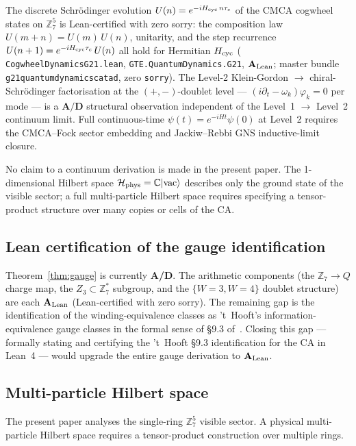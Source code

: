 \documentclass[11pt]{article}
\theoremstyle{remark}
\newcommand{\GTE}{\text{GTE}}
\newcommand{\lean}[1]{%
  \penalty-100
  \begingroup\def\_{\textunderscore\allowbreak}\texttt{#1}\endgroup}
\newcommand{\CatAL}{\ensuremath{\textbf{A}_{\rm Lean}}}
\newcommand{\CatAD}{\textbf{A/D}}
\newcommand{\ket}[1]{|{#1}\rangle}
\newcommand{\Hil}{\mathcal{H}}
\begin{document}
The discrete Schr\"odinger evolution $U(n) = e^{-iH_{\rm cyc}\,n\tau_c}$ of the
CMCA cogwheel states on $\mathbb{Z}_7^5$ is Lean-certified with zero sorry:
the composition law $U(m+n)=U(m)\,U(n)$, unitarity, and the step recurrence
$U(n+1)=e^{-iH_{\rm cyc}\tau_c}\,U(n)$ all hold for Hermitian $H_{\rm cyc}$
(\lean{CogwheelDynamicsG21.lean}, \lean{GTE.QuantumDynamics.G21}, $\CatAL$; master bundle \lean{g21\_quantum\_dynamics\_catad}, zero \texttt{sorry}).
The Level-2 Klein-Gordon $\to$ chiral-Schr\"odinger factorisation at the
$(+,-)$-doublet level --- $(i\partial_t - \omega_k)\varphi_k = 0$ per mode ---
is a $\CatAD$ structural observation independent of the Level~1 $\to$ Level~2
continuum limit.
Full continuous-time $\psi(t) = e^{-iHt}\psi(0)$ at Level~2 requires the
CMCA--Fock sector embedding and Jackiw--Rebbi GNS inductive-limit closure.

No claim to a continuum derivation is made in the present paper.
The 1-dimensional Hilbert space $\Hil_{\rm phys} = \mathbb{C}\ket{\text{vac}}$
describes only the ground state of the visible sector; a full
multi-particle Hilbert space requires specifying a tensor-product
structure over many copies or cells of the CA.

\subsection{Lean certification of the gauge identification}
\label{ssec:lean_gauge}

Theorem~\ref{thm:gauge} is currently \CatAD{}.
The arithmetic components (the $\mathbb{Z}_7 \to Q$ charge map,
the $Z_3 \subset \mathbb{Z}_7^*$ subgroup, and the $\{W=3,W=4\}$
doublet structure) are each \CatAL{} (Lean-certified with zero sorry).
The remaining gap is the identification of the winding-equivalence
classes as 't~Hooft's information-equivalence gauge classes in the
formal sense of \S9.3 of~\cite{tHooft2016CA}.
Closing this gap --- formally stating and certifying the 't~Hooft \S9.3
identification for the \GTE{} CA in Lean~4 --- would upgrade the
entire gauge derivation to \CatAL{}.

\subsection{Multi-particle Hilbert space}
\label{ssec:multiparticle}

The present paper analyses the single-ring $\mathbb{Z}_7^5$ visible
sector.
A physical multi-particle Hilbert space requires a tensor-product
construction over multiple rings.
\end{document}

